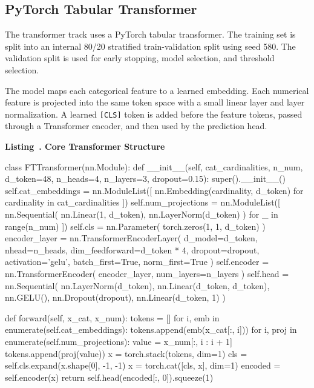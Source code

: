 \documentclass[10pt,twocolumn]{article}
\newcounter{listing}
\renewcommand{\thelisting}{\arabic{listing}}
\newcommand{\listingcaption}[2]{%
  \refstepcounter{listing}%
  \par\smallskip\noindent\textbf{Listing~\thelisting. #1}\label{#2}\par
}
\newcommand{\codestr}[1]{\textcolor{codestring}{\ttfamily #1}}
\begin{document}
\subsection{PyTorch Tabular Transformer}
The transformer track uses a PyTorch tabular transformer. The training set is split into an internal 80/20 stratified train-validation split using seed 580. The validation split is used for early stopping, model selection, and threshold selection.

The model maps each categorical feature to a learned embedding. Each numerical feature is projected into the same token space with a small linear layer and layer normalization. A learned \texttt{[CLS]} token is added before the feature tokens, passed through a Transformer encoder, and then used by the prediction head.

\listingcaption{Core Transformer Structure}{lst:ft-wide}
{\footnotesize
\begin{ReportCode}
class FTTransformer(nn.Module):
    def __init__(self, cat_cardinalities, n_num,
                 d_token=48, n_heads=4,
                 n_layers=3, dropout=0.15):
        super().__init__()
        self.cat_embeddings = nn.ModuleList([
            nn.Embedding(cardinality, d_token)
            for cardinality in cat_cardinalities
        ])
        self.num_projections = nn.ModuleList([
            nn.Sequential(
                nn.Linear(1, d_token),
                nn.LayerNorm(d_token)
            )
            for _ in range(n_num)
        ])
        self.cls = nn.Parameter(
            torch.zeros(1, 1, d_token)
        )
        encoder_layer = nn.TransformerEncoderLayer(
            d_model=d_token,
            nhead=n_heads,
            dim_feedforward=d_token * 4,
            dropout=dropout,
            activation=\codestr{'gelu'},
            batch_first=True,
            norm_first=True
        )
        self.encoder = nn.TransformerEncoder(
            encoder_layer,
            num_layers=n_layers
        )
        self.head = nn.Sequential(
            nn.LayerNorm(d_token),
            nn.Linear(d_token, d_token),
            nn.GELU(),
            nn.Dropout(dropout),
            nn.Linear(d_token, 1)
        )

    def forward(self, x_cat, x_num):
        tokens = []
        for i, emb in enumerate(self.cat_embeddings):
            tokens.append(emb(x_cat[:, i]))
        for i, proj in enumerate(self.num_projections):
            value = x_num[:, i : i + 1]
            tokens.append(proj(value))
        x = torch.stack(tokens, dim=1)
        cls = self.cls.expand(x.shape[0], -1, -1)
        x = torch.cat([cls, x], dim=1)
        encoded = self.encoder(x)
        return self.head(encoded[:, 0]).squeeze(1)
\end{ReportCode}
}
\end{document}
